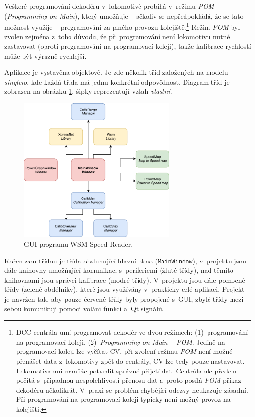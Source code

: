 Veškeré programování dekodéru v~lokomotivě probíhá v~režimu \textit{\gls{POM}}
(\textit{Programming on Main}), který umožňuje -- ačkoliv se nepředpokládá, že
se tato možnost využije -- programování za plného provozu
kolejiště.\footnote{\gls{DCC} centrála umí programovat dekodér ve dvou
režimech: (1)~programování na programovací koleji, (2)~\textit{Programming on
Main -- \gls{POM}}.  Jedině na programovací koleji lze vyčítat \gls{CV}, při
zvolení režimu \textit{\gls{POM}} není možné přenášet data z~lokomotivy zpět do
centrály, \gls{CV} lze tedy pouze nastavovat. Lokomotiva ani nemůže potvrdit
správné přijetí dat. Centrála ale předem počítá s~případnou nespolehlivostí
přenosu dat a~proto posílá \textit{\gls{POM}} příkaz dekodéru několikrát.
V~praxi se problém chybějící odezvy neukazuje zásadní. Při programování na
programovací koleji typicky není možný provoz na kolejišti.} Režim
\textit{\gls{POM}} byl zvolen zejména z~toho důvodu, že při programování není
lokomotivu nutné zastavovat (oproti programování na programovací koleji), takže
kalibrace rychlostí může být výrazně rychlejší.

Aplikace je vystavěna objektově. Je zde několik tříd založených na modelu
\textit{singleto}, kde každá třída má jednu konkrétní odpovědnost. Diagram
tříd je zobrazen na obrázku \ref{fig:ac-classes}, šipky reprezentují vztah
\textit{vlastní}.

\begin{figure}[ht]
\includegraphics[width=0.7\textwidth]{data/ac_classes.pdf}
\caption{GUI programu \gls{WSM} Speed Reader.}
\label{fig:ac-classes}
\end{figure}

Kořenovou třídou je třída obsluhující hlavní okno (\texttt{MainWindow}),
v~projektu jsou dále knihovny umožňující komunikaci s~periferiemi (žluté třídy),
nad těmito knihovnami jsou správci kalibrace (modré třídy). V~projektu jsou
dále pomocné třídy (zelené obdélníky), které jsou využívány v~prakticky celé
aplikaci. Projekt je navržen tak, aby pouze červené třídy byly propojené
s~GUI, zbylé třídy mezi sebou komunikují pomocí volání funkcí a~Qt signálů.

